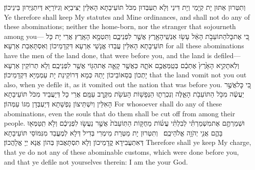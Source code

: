 {וְתִטְּרוּן אַתּוּן יָת קְיָמַי וְיָת דִּינַי וְלָא תַעְבְּדוּן מִכֹּל תּוֹעֵיבָתָא הָאִלֵּין יַצִּיבַיָּא וְגִיּוֹרַיָּא דְּיִתְגַּיְּרוּן בֵּינֵיכוֹן׃}
{Ye therefore shall keep My statutes and Mine ordinances, and shall not do any of these abominations; neither the home-born, nor the stranger that sojourneth among you—}{}
{כִּ֚י אֶת\maqqaf כׇּל\maqqaf הַתּוֹעֵבֹ֣ת הָאֵ֔ל עָשׂ֥וּ אַנְשֵֽׁי\maqqaf הָאָ֖רֶץ אֲשֶׁ֣ר לִפְנֵיכֶ֑ם וַתִּטְמָ֖א הָאָֽרֶץ׃}
{אֲרֵי יָת כָּל תּוֹעֵיבָתָא הָאִלֵּין עֲבַדוּ אֱנָשֵׁי אַרְעָא דִּקְדָמֵיכוֹן וְאִסְתָּאַבַת אַרְעָא׃}
{for all these abominations have the men of the land done, that were before you, and the land is defiled—}{}
{וְלֹֽא\maqqaf תָקִ֤יא הָאָ֙רֶץ֙ אֶתְכֶ֔ם בְּטַֽמַּאֲכֶ֖ם אֹתָ֑הּ כַּאֲשֶׁ֥ר קָאָ֛ה אֶת\maqqaf הַגּ֖וֹי אֲשֶׁ֥ר לִפְנֵיכֶֽם׃}
{וְלָא תְרוֹקֵין אַרְעָא יָתְכוֹן בְּסַאוֹבֵיכוֹן יָתַהּ כְּמָא דְּרוֹקֵינַת יָת עַמְמַיָּא דִּקְדָמֵיכוֹן׃}
{that the land vomit not you out also, when ye defile it, as it vomited out the nation that was before you.}{}
{כִּ֚י כׇּל\maqqaf אֲשֶׁ֣ר יַעֲשֶׂ֔ה מִכֹּ֥ל הַתּוֹעֵבֹ֖ת הָאֵ֑לֶּה וְנִכְרְת֛וּ הַנְּפָשׁ֥וֹת הָעֹשֹׂ֖ת מִקֶּ֥רֶב עַמָּֽם׃}
{אֲרֵי כָל דְּיַעֲבֵיד מִכֹּל תּוֹעֵיבָתָא הָאִלֵּין וְיִשְׁתֵּיצוֹן נַפְשָׁתָא דְּיַעְבְּדָן מִגּוֹ עַמְּהוֹן׃}
{For whosoever shall do any of these abominations, even the souls that do them shall be cut off from among their people.}{}
{וּשְׁמַרְתֶּ֣ם אֶת\maqqaf מִשְׁמַרְתִּ֗י לְבִלְתִּ֨י עֲשׂ֜וֹת מֵחֻקּ֤וֹת הַתּֽוֹעֵבֹת֙ אֲשֶׁ֣ר נַעֲשׂ֣וּ לִפְנֵיכֶ֔ם וְלֹ֥א תִֽטַּמְּא֖וּ בָּהֶ֑ם אֲנִ֖י יְהֹוָ֥ה אֱלֹהֵיכֶֽם׃ \petucha }
{וְתִטְּרוּן יָת מַטְּרַת מֵימְרִי בְּדִיל דְּלָא לְמֶעֱבַד מִנִּמּוֹסֵי תּוֹעֵיבָתָא דְּאִתְעֲבִידָא קֳדָמֵיכוֹן וְלָא תִסְתָּאֲבוּן בְּהוֹן אֲנָא יְיָ אֱלָהֲכוֹן׃}
{Therefore shall ye keep My charge, that ye do not any of these abominable customs, which were done before you, and that ye defile not yourselves therein: I am the \lord\space your God.}{}
